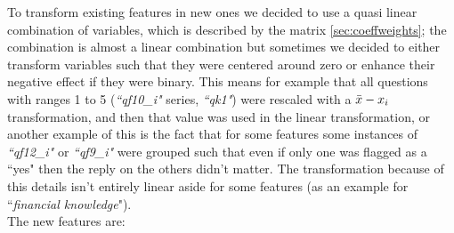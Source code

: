 \documentclass[a4paper,11pt]{article}
\begin{document}
To transform existing features in new ones we decided to use a quasi linear combination of variables, which is described by the matrix \ref{sec:coeffweights}; the combination is almost a linear combination but sometimes we decided to either transform variables such that they were centered around zero or enhance their negative effect if they were binary. This means for example that all questions with ranges 1 to 5 (\textit{``qf10\_i"} series, \textit{``qk1"}) were rescaled with a $\Bar{x}-x_i$ transformation, and then that value was used in the linear transformation, or another example of this is the fact that for some features some instances of \textit{``qf12\_i"} or \textit{``qf9\_i"} were grouped such that even if only one was flagged as a ``yes" then the reply on the others didn't matter. 
The transformation because of this details isn't entirely linear aside for some features (as an example for ``\textit{financial knowledge}"). \\

The new features are:
\end{document}
